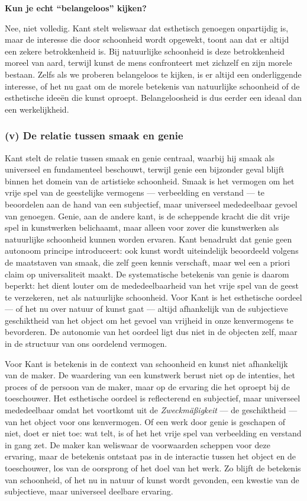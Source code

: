 \documentclass[11pt,twoside,openright]{memoir}
\begin{document}
\bigskip
\noindent
\textbf{Kun je echt “belangeloos” kijken?}
\medskip

Nee, niet volledig. Kant stelt weliswaar dat esthetisch genoegen onpartijdig is, maar de interesse die door schoonheid wordt opgewekt, toont aan dat er altijd een zekere betrokkenheid is. Bij natuurlijke schoonheid is deze betrokkenheid moreel van aard, terwijl kunst de mens confronteert met zichzelf en zijn morele bestaan. Zelfs als we proberen belangeloos te kijken, is er altijd een onderliggende interesse, of het nu gaat om de morele betekenis van natuurlijke schoonheid of de esthetische ideeën die kunst oproept. Belangeloosheid is dus eerder een ideaal dan een werkelijkheid.

\subsubsection{(v) De relatie tussen smaak en genie}

Kant stelt de relatie tussen smaak en genie centraal, waarbij hij smaak als universeel en fundamenteel beschouwt, terwijl genie een bijzonder geval blijft binnen het domein van de artistieke schoonheid. Smaak is het vermogen om het vrije spel van de geestelijke vermogens — verbeelding en verstand — te beoordelen aan de hand van een subjectief, maar universeel mededeelbaar gevoel van genoegen. Genie, aan de andere kant, is de scheppende kracht die dit vrije spel in kunstwerken belichaamt, maar alleen voor zover die kunstwerken als natuurlijke schoonheid kunnen worden ervaren. Kant benadrukt dat genie geen autonoom principe introduceert: ook kunst wordt uiteindelijk beoordeeld volgens de maatstaven van smaak, die zelf geen kennis verschaft, maar wel een a priori claim op universaliteit maakt. De systematische betekenis van genie is daarom beperkt: het dient louter om de mededeelbaarheid van het vrije spel van de geest te verzekeren, net als natuurlijke schoonheid. Voor Kant is het esthetische oordeel — of het nu over natuur of kunst gaat — altijd afhankelijk van de subjectieve geschiktheid van het object om het gevoel van vrijheid in onze kenvermogens te bevorderen. De autonomie van het oordeel ligt dus niet in de objecten zelf, maar in de structuur van ons oordelend vermogen.

Voor Kant is betekenis in de context van schoonheid en kunst niet afhankelijk van de maker. De waardering van een kunstwerk berust niet op de intenties, het proces of de persoon van de maker, maar op de ervaring die het oproept bij de toeschouwer. Het esthetische oordeel is reflecterend en subjectief, maar universeel mededeelbaar omdat het voortkomt uit de \textit{Zweckmäßigkeit} — de geschiktheid — van het object voor ons kenvermogen. Of een werk door genie is geschapen of niet, doet er niet toe: wat telt, is of het het vrije spel van verbeelding en verstand in gang zet. De maker kan weliswaar de voorwaarden scheppen voor deze ervaring, maar de betekenis ontstaat pas in de interactie tussen het object en de toeschouwer, los van de oorsprong of het doel van het werk. Zo blijft de betekenis van schoonheid, of het nu in natuur of kunst wordt gevonden, een kwestie van de subjectieve, maar universeel deelbare ervaring.
\end{document}
